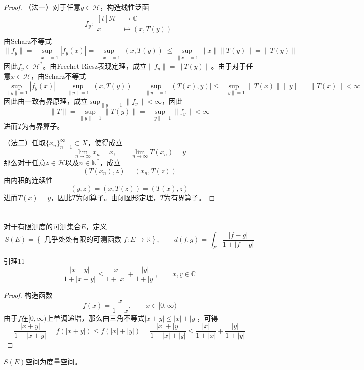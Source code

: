\documentclass[lang = cn, scheme = chinese]{elegantbook}
\newcommand{\N}{\mathbb{N}}            %
\newcommand{\R}{\mathbb{R}}            %
\newcommand{\C}{\mathbb{C}}  		   %
\newcommand{\sub}{\subset}             %
\begin{document}
\begin{proof}
	（法一）对于任意$y\in\mathcal{H}$，构造线性泛函
	\begin{align*}
		f_y:\begin{aligned}[t]
			\mathcal{H}&\longrightarrow \C\\
			x&\longmapsto (x,T(y))
		\end{aligned}
	\end{align*}
	由Scharz不等式
	$$
	\|f_y\|=\sup_{\|x\|=1}|f_y(x)|=\sup_{\|x\|=1}|(x,T(y))|\le \sup_{\|x\|=1}\|x\|\|T(y)\|=\|T(y)\|
	$$
	因此$f_y\in\mathcal{H}^*$。由Frechet-Riesz表现定理，成立$\|f_y\|=\|T(y)\|$。由于对于任意$x\in\mathcal{H}$，由Scharz不等式
	$$
	\sup_{\|y\|=1}|f_y(x)|
	=\sup_{\|y\|=1}|(x,T(y))|
	=\sup_{\|y\|=1}|(T(x),y)|
	\le\sup_{\|y\|=1}\|T(x)\|\|y\|
	=\|T(x)\|<\infty
	$$
	因此由一致有界原理，成立$\displaystyle\sup_{\|y\|=1}\|f_y\|<\infty$，因此
	$$
	\|T\|=\sup_{\|y\|=1}\|T(y)\|=\sup_{\|y\|=1}\|f_y\|<\infty
	$$
	进而$T$为有界算子。
	
	（法二）任取$\{x_n\}_{n=1}^{\infty}\sub X$，使得成立
	$$
	\lim_{n\to\infty}x_n=x,\qquad 
	\lim_{n\to\infty}T(x_n)=y
	$$
	那么对于任意$z\in\mathcal{H}$以及$n\in\N^*$，成立
	$$
	(T(x_n),z)=(x_n,T(z))
	$$
	由内积的连续性
	$$
	(y,z)=(x,T(z))=(T(x),z)
	$$
	进而$T(x)=y$，因此$T$为闭算子。由闭图形定理，$T$为有界算子。
\end{proof}

\chapter{}

\begin{definition}
	对于有限测度的可测集合$E$，定义
	$$
	S(E)=\left\{ \text{ 几乎处处有限的可测函数 }f:E\to\R \right\},\qquad 
	d(f,g)=\int_E \frac{|f-g|}{1+|f-g|}
	$$
\end{definition}

\begin{lemma}{}{引理11}
	$$
	\frac{|x+y|}{1+|x+y|}\le\frac{|x|}{1+|x|}+\frac{|y|}{1+|y|},\qquad x,y\in\C
	$$
\end{lemma}

\begin{proof}
	构造函数
	$$
	f(x)=\frac{x}{1+x},\qquad x\in[0,\infty)
	$$
	由于$f$在$[0,\infty)$上单调递增，那么由三角不等式$|x+y|\le |x|+|y|$，可得
	$$
	\frac{|x+y|}{1+|x+y|}
	= f(|x+y|)
	\le f(|x|+|y|)
	= \frac{|x|+|y|}{1+|x|+|y|}
	\le \frac{|x|}{1+|x|}+\frac{|y|}{1+|y|}
	$$
\end{proof}

\begin{proposition}
	$S(E)$空间为度量空间。
\end{proposition}
\end{document}

